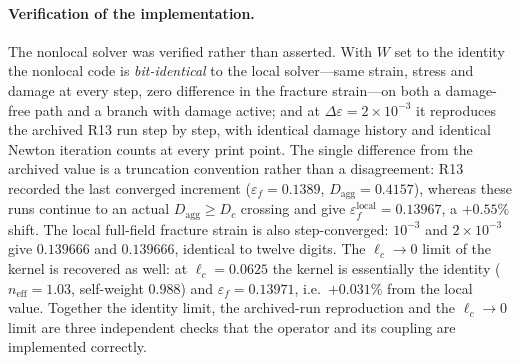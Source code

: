\documentclass[11pt,a4paper,twocolumn]{article}
\begin{document}
\paragraph{Verification of the implementation.} The nonlocal solver was verified rather than asserted. With
$W$ set to the identity the nonlocal code is \emph{bit-identical} to the local solver---same strain, stress
and damage at every step, zero difference in the fracture strain---on both a damage-free path and a branch
with damage active; and at $\Delta\varepsilon = 2\times10^{-3}$ it reproduces the archived R13 run step by
step, with identical damage history and identical Newton iteration counts at every print point. The single
difference from the archived value is a truncation convention rather than a disagreement: R13 recorded the
last converged increment ($\varepsilon_f = 0.1389$, $D_{\mathrm{agg}} = 0.4157$), whereas these runs continue
to an actual $D_{\mathrm{agg}} \ge D_c$ crossing and give $\varepsilon_f^{\mathrm{local}} = 0.13967$, a
$+0.55\%$ shift. The local full-field fracture strain is also step-converged: $10^{-3}$ and $2\times10^{-3}$
give $0.139666$ and $0.139666$, identical to twelve digits. The $\ell_c \to 0$ limit of the kernel is
recovered as well: at $\ell_c = 0.0625$ the kernel is essentially the identity ($n_{\mathrm{eff}} = 1.03$,
self-weight $0.988$) and $\varepsilon_f = 0.13971$, i.e.\ $+0.031\%$ from the local value. Together the
identity limit, the archived-run reproduction and the $\ell_c \to 0$ limit are three independent checks that
the operator and its coupling are implemented correctly.
\end{document}
